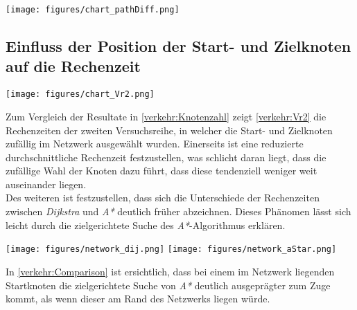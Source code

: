 \begin{wrapfigure}{}
\texttt{[image: figures/chart\_pathDiff.png]}

\caption{Relative Abweichung des kürzesten Pfads von der Luftlinie.}
\label{verkehr:pathDifference}
\end{wrapfigure}


\subsection{Einfluss der Position der Start- und Zielknoten auf die Rechenzeit}

\begin{wrapfigure}{}
\texttt{[image: figures/chart\_Vr2.png]}\\
\caption{Gemessene Rechenzeiten der zweiten Versuchsreihe in Abhängigkeit der Knotenzahl.}
\label{verkehr:Vr2}
\end{wrapfigure}

Zum Vergleich der Resultate in \ref{verkehr:Knotenzahl} zeigt \ref{verkehr:Vr2} die Rechenzeiten der zweiten Versuchsreihe, in welcher die Start- und Zielknoten zufällig im Netzwerk ausgewählt wurden. Einerseits ist eine reduzierte durchschnittliche Rechenzeit festzustellen, was schlicht daran liegt, dass die zufällige Wahl der Knoten dazu führt, dass diese tendenziell weniger weit auseinander liegen.\\
Des weiteren ist festzustellen, dass sich die Unterschiede der Rechenzeiten zwischen  \emph{Dijkstra} und \emph{A*} deutlich früher abzeichnen. Dieses Phänomen lässt sich leicht durch die zielgerichtete Suche des \emph{A*}-Algorithmus erklären.

\begin{wrapfigure}{}
\texttt{[image: figures/network\_dij.png]}\qquad
\texttt{[image: figures/network\_aStar.png]}
\caption{Suchpfad in grün mit \emph{Dijkstra} (links), und \emph{A*} (rechts). Besuchte Knoten sind in blau, resp. rot markiert.}
\label{verkehr:Comparison}
\end{wrapfigure}

In \ref{verkehr:Comparison} ist ersichtlich, dass bei einem im Netzwerk liegenden Startknoten die zielgerichtete Suche von \emph{A*} deutlich ausgeprägter zum Zuge kommt, als wenn dieser am Rand des Netzwerks liegen würde.
